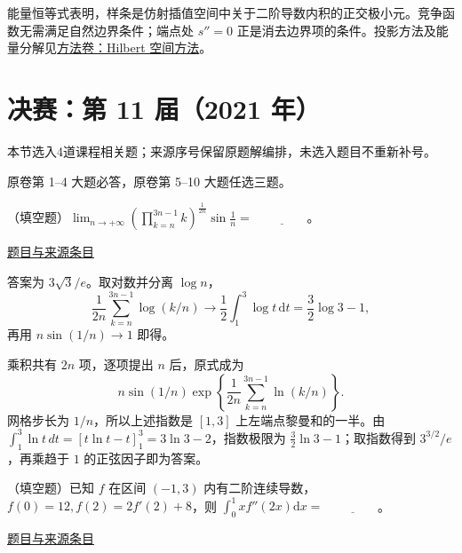 \documentclass[UTF8,12pt,a4paper,fontset=fandol]{ctexart}
\begin{document}
\begin{remark}[方法与条件]能量恒等式表明，样条是仿射插值空间中关于二阶导数内积的正交极小元。竞争函数无需满足自然边界条件；端点处 $s''=0$ 正是消去边界项的条件。投影方法及能量分解见\hyperref[app:integration-hilbert]{方法卷：Hilbert 空间方法}。\end{remark}

\section{决赛：第 11 届（2021 年）}

本节选入4道课程相关题；来源序号保留原题解编排，未选入题目不重新补号。

\begin{remark}[来源说明]原卷第 1--4 大题必答，原卷第 5--10 大题任选三题。\end{remark}

\begin{example}[来源序号1]\label{ex:fin11-high:1}\label{pr:fin11-high:1}

（填空题）$\lim_{n \to +\infty} \left( \prod_{k=n}^{3n-1} k \right)^{\frac{1}{2n}} \sin \frac{1}{n} = $ $\underline{\qquad\qquad}$。

\par\href{https://github.com/lzxcr/cmc-mathematics/blob/64916fa1fdbc3e444a652eca204d5669058ee321/src/problems/finals/11/01.md}{题目与来源条目}

\end{example}

\begin{solve}\label{ans:fin11-high:1}

答案为 $3\sqrt3/e$。取对数并分离 $\log n$，
\[
\frac1{2n}\sum_{k=n}^{3n-1}\log(k/n)\longrightarrow\frac12\int_1^3\log t\,\mathrm dt=\frac32\log3-1,
\]
再用 $n\sin(1/n)\to1$ 即得。

乘积共有 $2n$ 项，逐项提出 $n$ 后，原式成为
\[
n\sin(1/n)\exp\left\{\frac1{2n}\sum_{k=n}^{3n-1}\ln(k/n)\right\}.
\]
网格步长为 $1/n$，所以上述指数是 $[1,3]$ 上左端点黎曼和的一半。由 $\int_1^3\ln t\,dt=[t\ln t-t]_1^3=3\ln3-2$，指数极限为 $\tfrac32\ln3-1$；取指数得到 $3^{3/2}/e$，再乘趋于 $1$ 的正弦因子即为答案。

\end{solve}

\begin{example}[来源序号2]\label{ex:fin11-high:2}\label{pr:fin11-high:2}

（填空题）已知 $f$ 在区间 $(-1,3)$ 内有二阶连续导数，$f(0) = 12, f(2) = 2f'(2) + 8$，则 $\int_{0}^{1} xf''(2x) \mathrm{d} x = $ $\underline{\qquad\qquad}$。

\par\href{https://github.com/lzxcr/cmc-mathematics/blob/64916fa1fdbc3e444a652eca204d5669058ee321/src/problems/finals/11/02.md}{题目与来源条目}

\end{example}
\end{document}
